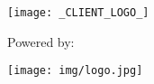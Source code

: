 \texttt{[image: \_CLIENT\_LOGO\_]}

\vspace{100px}

\centerline{Powered by:}
\texttt{[image: img/logo.jpg]}
\newpage